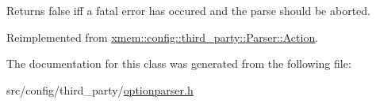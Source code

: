 Returns {\ttfamily false} iff a fatal error has occured and the parse should be aborted. 

Reimplemented from \hyperlink{structxmem_1_1config_1_1third__party_1_1_parser_1_1_action_aeffc43365955b3dc5f54552093518aa5}{xmem\+::config\+::third\+\_\+party\+::\+Parser\+::\+Action}.



The documentation for this class was generated from the following file\+:\begin{DoxyCompactItemize}
\item 
src/config/third\+\_\+party/\hyperlink{optionparser_8h}{optionparser.\+h}\end{DoxyCompactItemize}
